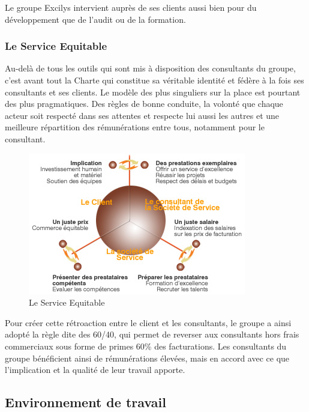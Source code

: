 Le groupe Excilys intervient auprès de ses clients aussi bien pour du développement que de l'audit ou de la formation.\\

\subsubsection{Le Service Equitable}

Au-delà de tous les outils qui sont mis à disposition des consultants du groupe, c’est avant tout la Charte qui constitue sa véritable identité et fédère à la fois ses consultants et ses clients. Le modèle des plus singuliers sur la place est pourtant des plus pragmatiques. Des règles de bonne conduite, la volonté que chaque acteur soit respecté dans ses attentes et respecte lui aussi les autres et une meilleure répartition des rémunérations entre tous, notamment pour le consultant.

\begin{figure}[h!]
	\centering
		\includegraphics[scale=1]{service-equitable.jpg}
	\caption{Le Service Equitable}
\end{figure}

Pour créer cette rétroaction entre le client et les consultants, le groupe a ainsi adopté la règle dite des 60/40, qui permet de reverser aux consultants hors frais commerciaux sous forme de primes 60\% des facturations. Les consultants du groupe bénéficient ainsi de rémunérations élevées, mais en accord avec ce que l’implication et la qualité de leur travail apporte.

\subsection{Environnement de travail}

